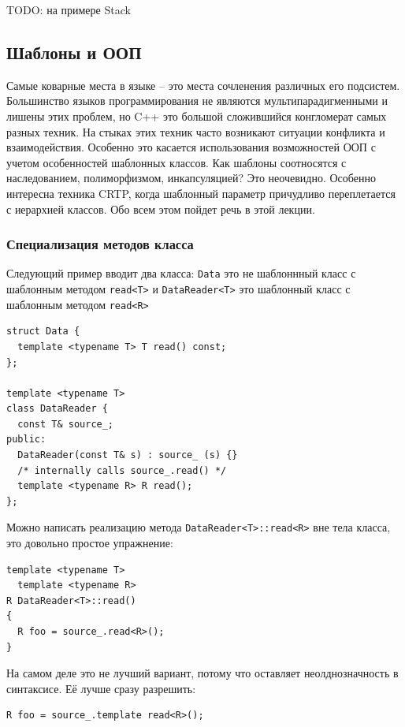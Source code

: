 \documentclass[a4paper,12pt,oneside]{article}
\begin{document}
TODO: на примере Stack

\pagebreak
\subsection{Шаблоны и ООП}\label{OOTemplates}

Самые коварные места в языке -- это места сочленения различных его подсистем. Большинство языков программирования не являются мультипарадигменными и лишены этих проблем, но C++ это большой сложившийся конгломерат самых разных техник. На стыках этих техник часто возникают ситуации конфликта и взаимодействия. Особенно это касается использования возможностей ООП с учетом особенностей шаблонных классов. Как шаблоны соотносятся с наследованием, полиморфизмом, инкапсуляцией? Это неочевидно. Особенно интересна техника CRTP, когда шаблонный параметр причудливо переплетается с иерархией классов. Обо всем этом пойдет речь в этой лекции.

\subsubsection{Специализация методов класса}\label{MemberSpec}

Следующий пример вводит два класса: \lstinline!Data! это не шаблоннный класс с шаблонным методом \lstinline!read<T>! и \lstinline!DataReader<T>! это шаблонный класс с шаблонным методом \lstinline!read<R>!

\begin{lstlisting}
struct Data {
  template <typename T> T read() const;
};

template <typename T>  
class DataReader {
  const T& source_;
public:
  DataReader(const T& s) : source_ (s) {}
  /* internally calls source_.read() */
  template <typename R> R read();
};
\end{lstlisting}

Можно написать реализацию метода \lstinline!DataReader<T>::read<R>! вне тела класса, это довольно простое упражнение:

\begin{lstlisting}
template <typename T>
  template <typename R> 
R DataReader<T>::read()
{
  R foo = source_.read<R>();
}
\end{lstlisting}

На самом деле это не лучший вариант, потому что оставляет неолднозначность в синтаксисе. Её лучше сразу разрешить:

\begin{lstlisting}
R foo = source_.template read<R>();
\end{lstlisting}
\end{document}
